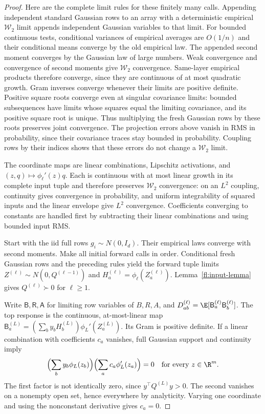 \begin{proof}
Here are the complete limit rules for these finitely many calls. Appending
independent standard Gaussian rows to an array with a deterministic empirical
$\mathcal W_2$ limit appends independent Gaussian variables to that limit.
For bounded continuous tests, conditional variances of empirical averages
are $O(1/n)$ and their conditional means converge by the old empirical law.
The appended second moment converges by the Gaussian law of large numbers.
Weak convergence and convergence of second moments give $\mathcal W_2$
convergence. Same-layer empirical products therefore converge, since they
are continuous of at most quadratic growth. Gram inverses converge whenever
their limits are positive definite. Positive square roots converge even at
singular covariance limits: bounded subsequences have limits whose squares
equal the limiting covariance, and its positive square root is unique.
Thus multiplying the fresh Gaussian rows by these roots preserves joint
convergence. The projection errors above vanish in RMS in probability,
since their covariance traces stay bounded in probability. Coupling rows
by their indices shows that these errors do not change a $\mathcal W_2$ limit.

The coordinate maps are linear combinations, Lipschitz activations, and
$(z,q)\mapsto\phi_\ell'(z)q$. Each is continuous with at most linear
growth in its complete input tuple and therefore preserves $\mathcal W_2$
convergence: on an $L^2$ coupling, continuity gives convergence in probability,
and uniform integrability of squared inputs and the linear envelope give
$L^2$ convergence. Coefficients converging to constants are handled first
by subtracting their linear combinations and using bounded input RMS.

Start with the iid full rows $g_i\sim N(0,I_d)$. Their empirical laws
converge with second moments. Make all initial forward calls in order.
Conditional fresh Gaussian rows and the preceding rules yield the forward
tuple limits $Z^{(\ell)}\sim N(0,Q^{(\ell-1)})$ and
$H_a^{(\ell)}=\phi_\ell(Z_a^{(\ell)})$.
Lemma~\ref{fl:input-lemma} gives $Q^{(\ell)}\succ0$ for $\ell\ge1$.

Write $\mathsf B,\mathsf R,\mathsf A$ for limiting row variables of
$B,R,A$, and $D^{(\ell)}_{ab}=\E[\mathsf B_a^{(\ell)}
\mathsf B_b^{(\ell)}]$. The top response is the continuous, at-most-linear
map $\mathsf B_a^{(L)}=(\sum_b y_bH_b^{(L)})\phi_L'(Z_a^{(L)})$.
Its Gram is positive definite. If a linear combination with coefficients
$c_a$ vanishes, full Gaussian support and continuity imply
\[
 \Bigl(\sum_b y_b\phi_L(z_b)\Bigr)
 \Bigl(\sum_a c_a\phi_L'(z_a)\Bigr)=0
 \quad\hbox{for every }z\in\R^m.
\]
The first factor is not identically zero, since $y^\top Q^{(L)}y>0$.
The second vanishes on a nonempty open set, hence everywhere by analyticity.
Varying one coordinate and using the nonconstant derivative gives $c_a=0$.


\end{proof}
